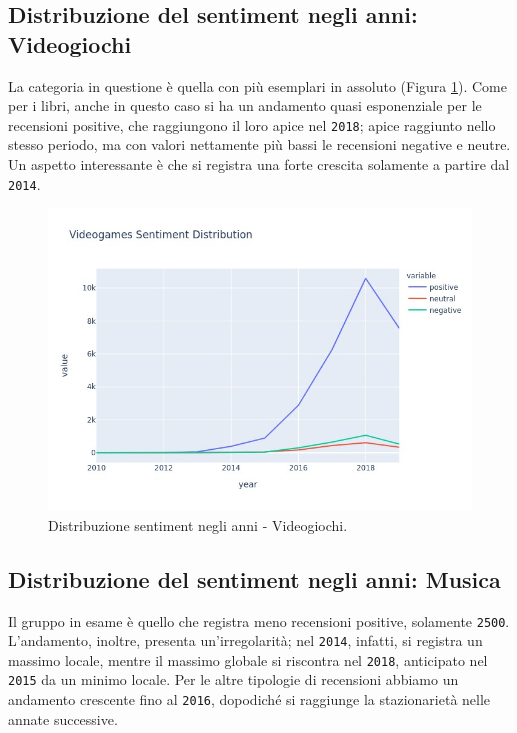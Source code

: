 			\subsection{Distribuzione del sentiment negli anni: Videogiochi}
				La categoria in questione è quella con più esemplari in assoluto (Figura \ref{fig:sent_year_videogames}). Come per i libri, anche in questo caso si ha un andamento quasi esponenziale per le recensioni positive, che raggiungono il loro apice nel \verb|2018|; apice raggiunto nello stesso periodo, ma con valori nettamente più bassi le recensioni negative e neutre. Un aspetto interessante è che si registra una forte crescita solamente a partire dal \verb|2014|.
				
			\begin{figure} [h]
				\includegraphics[width=\textwidth]{Figure/sent_year_videogames}
				\caption{Distribuzione sentiment negli anni - Videogiochi.}
				\label{fig:sent_year_videogames}
			\end{figure}
		
		
			\subsection{Distribuzione del sentiment negli anni: Musica}
				Il gruppo in esame è quello che registra meno recensioni positive, solamente \verb|2500|. L'andamento, inoltre, presenta un'irregolarità; nel \verb|2014|, infatti, si registra un massimo locale, mentre il massimo globale si riscontra nel \verb|2018|, anticipato nel \verb|2015| da un minimo locale. Per le altre tipologie di recensioni abbiamo un andamento crescente fino al \verb|2016|, dopodiché si raggiunge la stazionarietà nelle annate successive.
				
